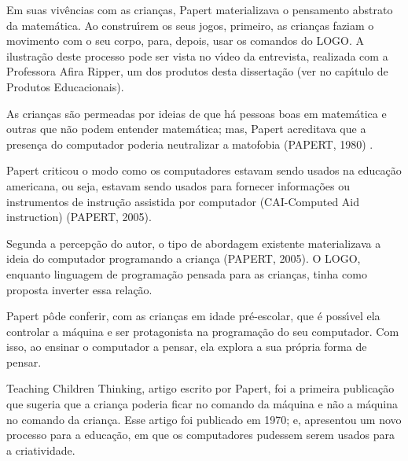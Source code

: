 \documentclass[
12pt,		%
openright,	%
twoside,  %
a4paper,			%
chapter=TITLE,		%
english,			%
french,				%
spanish,			%
brazil				%
]{USPSC-classe/USPSC}
\begin{document}
Em suas viv\^encias com as crian\c{c}as, Papert materializava o pensamento abstrato da matem\'atica. Ao constru\'{\i}rem os seus jogos, primeiro, as crian\c{c}as faziam o movimento com o seu corpo, para, depois, usar os comandos do LOGO. A ilustra\c{c}\~ao deste processo pode ser vista no v\'{\i}deo  da entrevista, realizada com a Professora Afira Ripper,  um dos produtos desta disserta\c{c}\~ao (ver no cap\'{\i}tulo de Produtos Educacionais).









As crian\c{c}as s\~ao permeadas por ideias de que h\'a pessoas boas em matem\'atica e outras que n\~ao podem entender matem\'atica; mas, Papert acreditava que a presen\c{c}a do computador poderia neutralizar a matofobia (PAPERT, 1980) .









Papert criticou o modo como os computadores estavam sendo usados na educa\c{c}\~ao americana, ou seja, estavam sendo usados para fornecer informa\c{c}\~oes ou instrumentos de instru\c{c}\~ao assistida por computador (CAI-Computed Aid instruction)  (PAPERT, 2005).









Segunda a percep\c{c}\~ao do autor, o tipo de abordagem existente materializava a ideia do computador programando a crian\c{c}a (PAPERT, 2005). O LOGO, enquanto linguagem de programa\c{c}\~ao pensada para as crian\c{c}as, tinha como proposta inverter essa rela\c{c}\~ao.









Papert p\^ode conferir, com as crian\c{c}as em idade pr\'e-escolar, que \'e poss\'{\i}vel ela controlar a m\'aquina e ser protagonista na programa\c{c}\~ao do seu computador. Com isso, ao ensinar o computador a pensar, ela explora a sua pr\'opria forma de pensar.









Teaching Children Thinking, artigo escrito por Papert, foi a primeira publica\c{c}\~ao que sugeria que a crian\c{c}a poderia ficar no comando da m\'aquina e n\~ao a m\'aquina no comando da crian\c{c}a.  Esse artigo  foi publicado em 1970; e,  apresentou um novo processo para a educa\c{c}\~ao, em que os computadores pudessem serem usados para a criatividade.
\end{document}
